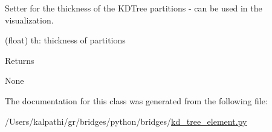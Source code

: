 Setter for the thickness of the K\+D\+Tree partitions -\/ can be used in the visualization. 

\begin{DoxyVerb}       (float) th: thickness of partitions
\end{DoxyVerb}
 \begin{DoxyReturn}{Returns}


None 
\end{DoxyReturn}


The documentation for this class was generated from the following file\+:\begin{DoxyCompactItemize}
\item 
/\+Users/kalpathi/gr/bridges/python/bridges/\mbox{\hyperlink{kd__tree__element_8py}{kd\+\_\+tree\+\_\+element.\+py}}\end{DoxyCompactItemize}
